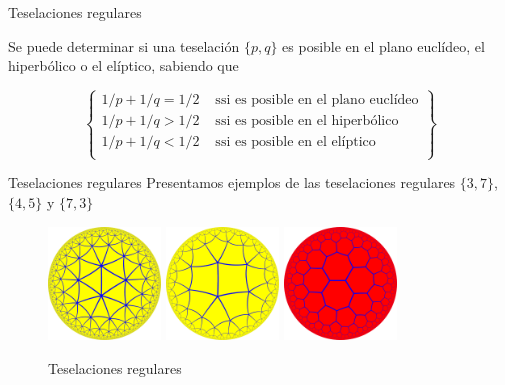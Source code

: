 \documentclass[compress]{beamer}
\begin{document}
\begin{frame}{Teselaciones regulares}
  \begin{theorem}
  Se puede determinar si una teselación $\{p,q\}$ es posible en el plano
  euclídeo, el hiperbólico o el elíptico, sabiendo que

  \[
    \left\{
      \begin{array}{cc}
        1/p + 1/q = 1/2    &\text{ ssi es posible en el plano euclídeo} \\
        1/p + 1/q > 1/2 &\text{ ssi es posible en el hiperbólico} \\
        1/p + 1/q < 1/2 &\text{ ssi es posible en el elíptico} \\
      \end{array}
    \right\}
  \]
\end{theorem}
\end{frame}

\begin{frame}{Teselaciones regulares}
  Presentamos ejemplos de las teselaciones regulares $\{3,7\}$, $\{4,5\}$
  y $\{7,3\}$

  \begin{figure}[ht!]
    \centering
    \includegraphics[width=30mm]{./tiling-3-7.png}
    \quad
    \includegraphics[width=30mm]{./tiling-4-5.png}
    \quad
    \includegraphics[width=30mm]{./tiling-7-3.png}
    \caption{Teselaciones regulares \label{tiling}}
  \end{figure}
\end{frame}
\end{document}
